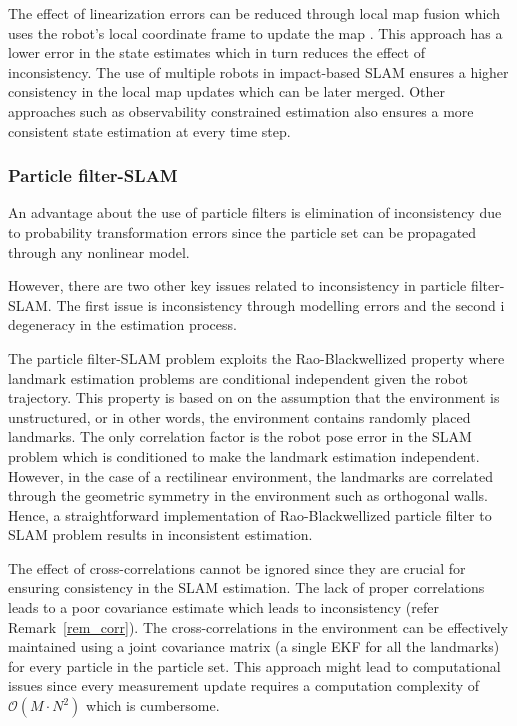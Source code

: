 The effect of linearization errors can be reduced through local map fusion which uses the robot's local coordinate frame to update the map \cite{castellanos2007robocentric}. This approach has a lower error in the state estimates which in turn reduces the effect of inconsistency. The use of multiple robots in impact-based SLAM ensures a higher consistency in the local map updates which can be later merged. Other approaches such as observability constrained estimation \cite{huang2011observability} also ensures a more consistent state estimation at every time step.

\subsubsection{Particle filter-SLAM}
An advantage about the use of particle filters is elimination of inconsistency due to probability transformation errors since the particle set can be propagated through any nonlinear model. 

However, there are two other key issues related to inconsistency in particle filter-SLAM. The first issue is inconsistency through modelling errors and the second i degeneracy in the estimation process.

The particle filter-SLAM problem exploits the Rao-Blackwellized property where landmark estimation problems are conditional independent given the robot trajectory. This property is based on on the assumption that the environment is unstructured, or in other words, the environment contains randomly placed landmarks. The only correlation factor is the robot pose error in the SLAM problem which is conditioned to make the landmark estimation independent. However, in the case of a rectilinear environment, the landmarks are correlated through the geometric symmetry in the environment such as orthogonal walls. Hence, a straightforward implementation of Rao-Blackwellized particle filter to SLAM problem results in inconsistent estimation. 

The effect of cross-correlations cannot be ignored since they are crucial for ensuring consistency in the SLAM estimation. The lack of proper correlations leads to a poor covariance estimate which leads to inconsistency (refer Remark~\ref{rem_corr}). The cross-correlations in the environment can be effectively maintained using a joint covariance matrix (a single EKF for all the landmarks) for every particle in the particle set. This approach might lead to computational issues since every measurement update requires a computation complexity of $\mathcal{O}(M\cdot N^2)$ which is cumbersome.

